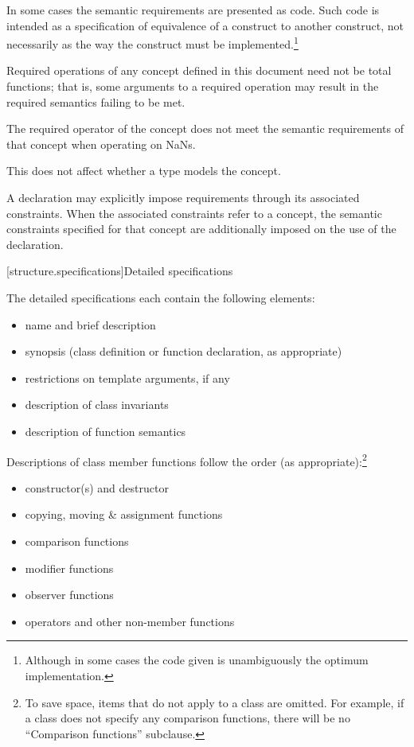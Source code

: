 \pnum
In some cases the semantic requirements are presented as \Cpp{} code.
Such code is intended as a
specification of equivalence of a construct to another construct, not
necessarily as the way the construct
must be implemented.\footnote{Although in some cases the code given is
unambiguously the optimum implementation.}

\pnum
Required operations of any concept defined in this document need not be
total functions; that is, some arguments to a required operation may
result in the required semantics failing to be met.
\begin{example}
The required \tcode{<} operator of the 
concept does not meet the
semantic requirements of that concept when operating on NaNs.
\end{example}
This does not affect whether a type models the concept.

\pnum
A declaration may explicitly impose requirements through its associated
constraints. When the associated constraints refer to a
concept, the semantic constraints specified for that concept
are additionally imposed on the use of the declaration.

[structure.specifications]{Detailed specifications}

\pnum
The detailed specifications each contain the following elements:%

\begin{itemize}
\item name and brief description
\item synopsis (class definition or function declaration, as appropriate)
\item restrictions on template arguments, if any
\item description of class invariants
\item description of function semantics
\end{itemize}

\pnum
Descriptions of class member functions follow the order (as
appropriate):\footnote{To save space, items that do not apply to a class are omitted.
For example, if a class does not specify any comparison functions, there
will be no ``Comparison functions'' subclause.}

\begin{itemize}
\item constructor(s) and destructor
\item copying, moving \& assignment functions
\item comparison functions
\item modifier functions
\item observer functions
\item operators and other non-member functions
\end{itemize}

